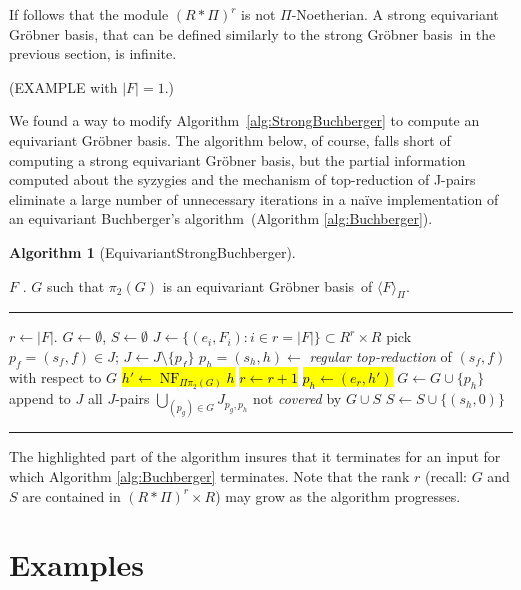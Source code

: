 \documentclass{amsart}
\theoremstyle{definition}
\newtheorem{algorithm}[theorem]{Algorithm}
\theoremstyle{remark}
\numberwithin{equation}{section}
\newcommand{\ideal}[1]{\langle #1 \rangle}
\DeclareMathOperator{\NF}{NF}
\newcommand{\GB}{{Gr\"obner basis}}
\begin{document}
If follows that the module $(R*\Pi)^r$ is not $\Pi$-Noetherian. A strong equivariant \GB, that can be defined similarly to the strong \GB\ in the previous section, is infinite.

(EXAMPLE with $|F|=1$.)

We found a way to modify Algorithm~\ref{alg:StrongBuchberger} to compute an equivariant \GB.  The algorithm below, of course, falls short of computing a strong equivariant \GB, but the partial information computed about the syzygies and the mechanism of top-reduction of J-pairs eliminate a large number of unnecessary iterations in a na\"ive implementation of an equivariant Buchberger's algorithm~(Algorithm \ref{alg:Buchberger}).

\begin{algorithm}[EquivariantStrongBuchberger]
\begin{algorithmic}[1]
\REQUIRE $F$ .
\ENSURE $G$ such that $\pi_2(G)$ is an equivariant \GB\ of $\ideal{F}_\Pi$.
\smallskip \hrule \smallskip
\STATE $r\gets |F|$.
\STATE $G\gets \emptyset$, $S\gets \emptyset$ 
\STATE $J\gets \{(e_i,F_i):i\in r=|F|\} \subset R^r\times R$ 
	\STATE pick $p_f = (s_f,f) \in J$; $J\gets J\setminus\{p_f\}$
	\STATE $p_h=(s_h,h) \gets$ {\em regular top-reduction} of $(s_f,f)$ with respect to $G$
		\STATE \hl{$h' \gets\NF_{\Pi\pi_2(G)} h$}
				\STATE \hl{$r\gets r+1$}
				\STATE \hl{$p_h \gets (e_r,h')$}
			\ENDIF
			\STATE $G\gets G\cup \{p_h\}$
			\STATE append to $J$ all $J$-pairs $\bigcup_{(p_g)\in G}J_{p_g,p_h}$ not {\em covered} by $G \cup S$ 
		\ENDIF
        \ELSE 
                \STATE $S\gets S\cup\{(s_h,0)\}$
	\ENDIF
\ENDWHILE
\smallskip \hrule \smallskip
\end{algorithmic}
\end{algorithm}

The highlighted part of the algorithm insures that it terminates for an input for which Algorithm \ref{alg:Buchberger} terminates.
Note that the rank $r$ (recall: $G$ and $S$ are contained in $(R*\Pi)^r\times R$) may grow as the algorithm progresses. 

\section{Examples}



\end{document}
